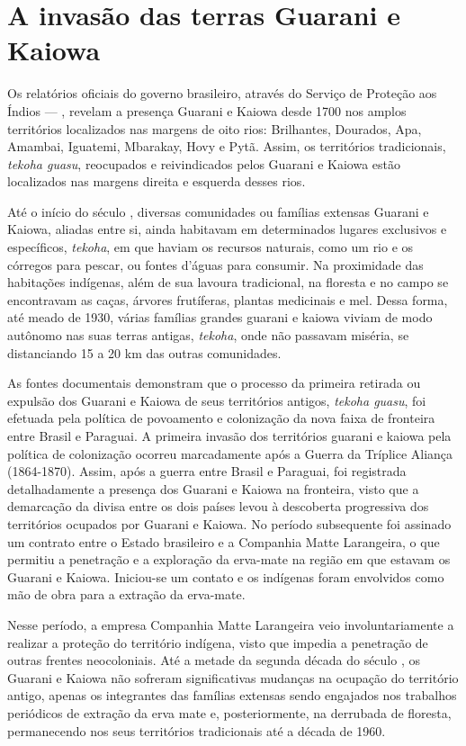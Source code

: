 \section{A invasão das terras Guarani e Kaiowa}

Os relatórios oficiais do governo brasileiro, através do Serviço de
Proteção aos Índios --- , revelam a presença Guarani e Kaiowa desde
1700 nos amplos territórios localizados nas margens de oito rios:
Brilhantes, Dourados, Apa, Amambai, Iguatemi, Mbarakay, Hovy e Pytã.
Assim, os territórios tradicionais, \emph{tekoha guasu}, reocupados e
reivindicados pelos Guarani e Kaiowa estão localizados nas margens
direita e esquerda desses rios.

Até o início do século , diversas comunidades ou famílias extensas
Guarani e Kaiowa, aliadas entre si, ainda habitavam em determinados
lugares exclusivos e específicos, \emph{tekoha}, em que haviam os recursos
naturais, como um rio e os córregos para pescar, ou fontes d’águas para
consumir. Na proximidade das habitações indígenas, além de sua lavoura
tradicional, na floresta e no campo se encontravam as caças, árvores
frutíferas, plantas medicinais e mel. Dessa forma, até meado de 1930,
várias famílias grandes guarani e kaiowa viviam de modo autônomo nas
suas terras antigas, \emph{tekoha}, onde não passavam miséria, se distanciando
15 a 20 km das outras comunidades.

As fontes documentais demonstram que o processo da primeira retirada ou
expulsão dos Guarani e Kaiowa de seus territórios antigos, \emph{tekoha
guasu}, foi efetuada pela política de povoamento e colonização da nova
faixa de fronteira entre Brasil e Paraguai. A primeira invasão dos
territórios guarani e kaiowa pela política de colonização ocorreu
marcadamente após a Guerra da Tríplice Aliança (1864-1870). Assim, após
a guerra entre Brasil e Paraguai, foi registrada detalhadamente a
presença dos Guarani e Kaiowa na fronteira, visto que a demarcação da
divisa entre os dois países levou à descoberta progressiva dos
territórios ocupados por Guarani e Kaiowa. No período subsequente foi
assinado um contrato entre o Estado brasileiro e a Companhia Matte
Larangeira, o que permitiu a penetração e a exploração da erva-mate na
região em que estavam os Guarani e Kaiowa. Iniciou-se um contato e os
indígenas foram envolvidos como mão de obra para a extração da
erva-mate.

Nesse período, a empresa Companhia Matte Larangeira veio
involuntariamente a realizar a proteção do território indígena, visto
que impedia a penetração de outras frentes neocoloniais. Até a metade
da segunda década do século , os Guarani e Kaiowa não sofreram
significativas mudanças na ocupação do território antigo, apenas os
integrantes das famílias extensas sendo engajados nos trabalhos
periódicos de extração da erva mate e, posteriormente, na derrubada de
floresta, permanecendo nos seus territórios tradicionais até a década
de 1960.

